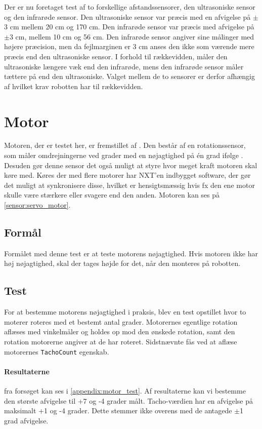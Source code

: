 Der er nu foretaget test af to forskellige afstandssensorer, den ultrasoniske sensor og den infrarøde sensor. 
Den ultrasoniske sensor var præcis med en afvigelse på $\pm$3 cm mellem 20 cm og 170 cm.
Den infrarøde sensor var præcis med afvigelse på $\pm$3 cm, mellem 10 cm og 56 cm.
Den infrarøde sensor angiver sine målinger med højere præcision, men da fejlmarginen er 3 cm anses den ikke som værende mere præcis end den ultrasoniske sensor.
I forhold til rækkevidden, måler den ultrasoniske længere væk end den infrarøde, mens den infrarøde sensor måler tættere på end den ultrasoniske.
Valget mellem de to sensorer er derfor afhængig af hvilket krav robotten har til rækkevidden.

\section{Motor}\label{sensorer:motorer}
Motoren, der er testet her, er fremstillet af \lego.
Den består af en rotationssensor, som måler omdrejningerne ved grader med en nøjagtighed på \'en grad ifølge \lego. 
Desuden gør denne sensor det også muligt at styre hvor meget kraft motoren skal køre med.
Køres der med flere motorer har NXT'en indbygget software, der gør det muligt at synkronisere disse, hvilket er hensigtsmæssig hvis fx den ene motor skulle være stærkere eller svagere end den anden.\cite{tikNXT}
Motoren kan ses på \cref{sensor:servo_motor}.

\subsection{Formål}
Formålet med denne test er at teste motorens nøjagtighed.
Hvis motoren ikke har høj nøjagtighed, skal der tages højde for det, når den monteres på robotten.

\subsection{Test}
For at bestemme motorens nøjagtighed i praksis, blev en test opstillet hvor to moterer roteres med et bestemt antal grader.
Motorernes egentlige rotation aflæses med vinkelmåler og holdes op mod den ønskede rotation, samt den rotation motorerne angiver at de har roteret.
Sidstnævnte fås ved at aflæse motorernes \lstinline[style=csharp]!TachoCount! egenskab.

\paragraph{Resultaterne} fra forsøget kan ses i \cref{appendix:motor_test}. 
Af resultaterne kan vi bestemme den største afvigelse til +7 og -4 grader målt.
Tacho-værdien har en afvigelse på maksimalt +1 og -4 grader.
Dette stemmer ikke overens med de antagede $\pm$1 grad afvigelse.

